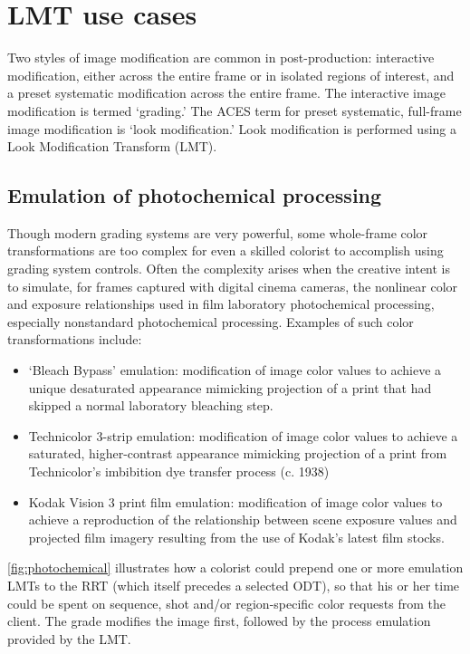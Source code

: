 \regularsectionformat	%
\chapter{LMT use cases}

Two styles of image modification are common in post-production: interactive modification, either across the entire frame or in isolated regions of interest, and a preset systematic modification across the entire frame. The interactive image modification is termed `grading.' The ACES term for preset systematic, full-frame image modification is `look modification.' Look modification is performed using a Look Modification Transform (LMT).

\section{Emulation of photochemical processing}
Though modern grading systems are very powerful, some whole-frame color transformations are too complex for even a skilled colorist to accomplish using grading system controls. Often the complexity arises when the creative intent is to simulate, for frames captured with digital cinema cameras, the nonlinear color and exposure relationships used in film laboratory photochemical processing, especially nonstandard photochemical processing. Examples of such color transformations include:

\begin{itemize}
    \item   `Bleach Bypass' emulation: modification of image color values to achieve a unique desaturated appearance mimicking projection of a print that had skipped a normal laboratory bleaching step.
    \item   Technicolor 3-strip emulation: modification of image color values to achieve a saturated, higher-contrast appearance mimicking projection of a print from Technicolor’s imbibition dye transfer process (c. 1938)
    \item   Kodak Vision 3 print film emulation: modification of image color values to achieve a reproduction of the relationship between scene exposure values and projected film imagery resulting from the use of Kodak’s latest film stocks.
\end{itemize}

\autoref{fig:photochemical} illustrates how a colorist could prepend one or more emulation LMTs to the RRT (which itself precedes a selected ODT), so that his or her time could be spent on sequence, shot and/or region-specific color requests from the client. The grade modifies the image first, followed by the process emulation provided by the LMT.

